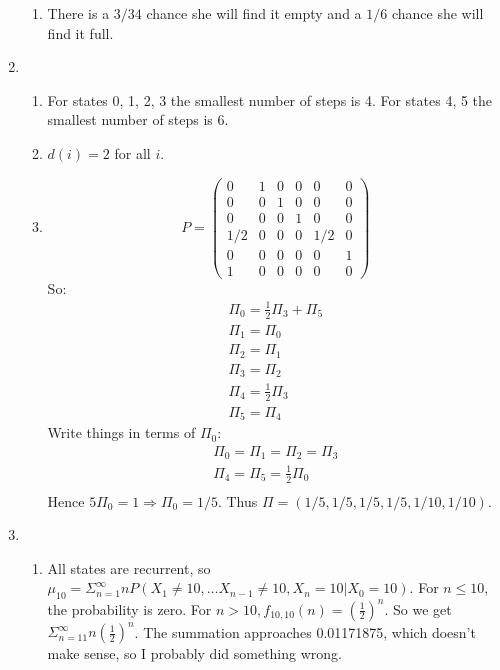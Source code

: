 \documentclass{article}
\begin{document}
\begin{enumerate}
\begin{enumerate}
			\item There is a $3/34$ chance she will find it empty and a $1/6$ chance she will find it full.
		\end{enumerate}
	\item %
		\begin{enumerate}
			\item For states 0, 1, 2, 3 the smallest number of steps is 4. For states 4, 5 the smallest number of steps is 6.
			\item $d(i) = 2$ for all $i$.
			\item
				\begin{displaymath}
					P = \left( \begin{array}{cccccc}
					0 & 1 & 0 & 0 & 0 & 0 \\
					0 & 0 & 1 & 0 & 0 & 0 \\
					0 & 0 & 0 & 1 & 0 & 0 \\
					1/2 & 0 & 0 & 0 & 1/2 & 0 \\
					0 & 0 & 0 & 0 & 0 & 1 \\
					1 & 0 & 0 & 0 & 0 & 0
					\end{array} \right)
				\end{displaymath}
				So:
				\begin{displaymath}
					\begin{array}{l}
						\Pi_0 = \frac{1}{2} \Pi_3 + \Pi_5 \\
						\Pi_1 = \Pi_0 \\
						\Pi_2 = \Pi_1 \\
						\Pi_3 = \Pi_2 \\
						\Pi_4 = \frac{1}{2} \Pi_3 \\
						\Pi_5 = \Pi_4
					\end{array}
				\end{displaymath}
				Write things in terms of $\Pi_0$:
				\begin{displaymath}
					\begin{array}{l}
						\Pi_0 = \Pi_1 = \Pi_2 = \Pi_3 \\
						\Pi_4 = \Pi_5 = \frac{1}{2} \Pi_0 \\
					\end{array}
				\end{displaymath}
				Hence $5 \Pi_0 = 1 \Rightarrow \Pi_0 = 1/5$. Thus $\Pi = (1/5, 1/5, 1/5, 1/5, 1/10, 1/10)$.
		\end{enumerate}
	\item %
		\begin{enumerate}
			\item All states are recurrent, so $\mu_{10} = \Sigma_{n=1}^\infty n P(X_1 \ne 10, \dots X_{n-1} \ne 10, X_n = 10 | X_0 = 10)$. For $n \le 10$, the probability is zero. For $n > 10, f_{10, 10}(n) = (\frac{1}{2})^n$. So we get $\Sigma_{n=11}^\infty n (\frac{1}{2})^n$. The summation approaches 0.01171875, which doesn't make sense, so I probably did something wrong.

\end{enumerate}
\end{enumerate}
\end{document}
